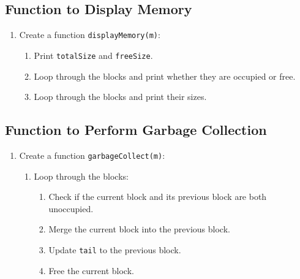 {  \subsection{Function to Display Memory}
  \begin{enumerate}[label=\arabic*.,left=0pt]
    \item Create a function \texttt{displayMemory(m)}:
          \begin{enumerate}[label=2.\arabic*.,left=0pt]
            \item Print \texttt{totalSize} and \texttt{freeSize}.
            \item Loop through the blocks and print whether they are occupied or free.
            \item Loop through the blocks and print their sizes.
          \end{enumerate}
  \end{enumerate}

  \subsection{Function to Perform Garbage Collection}
  \begin{enumerate}[label=\arabic*.,left=0pt]
    \item Create a function \texttt{garbageCollect(m)}:
          \begin{enumerate}[label=2.\arabic*.,left=0pt]
            \item Loop through the blocks:
                  \begin{enumerate}[label=2.2.\arabic*.,left=0pt]
                    \item Check if the current block and its previous block are both unoccupied.
                    \item Merge the current block into the previous block.
                    \item Update \texttt{tail} to the previous block.
                    \item Free the current block.
                  \end{enumerate}
          \end{enumerate}
  \end{enumerate}

}
